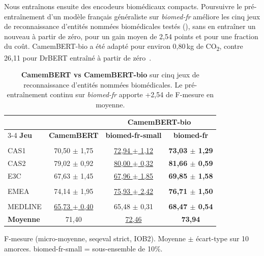 
\noindent Nous entraînons ensuite des encodeurs biomédicaux compacts. Poursuivre le
pré-entraînement d'un modèle français généraliste sur \emph{biomed-fr} améliore les
cinq jeux de reconnaissance d'entités nommées biomédicales testés
(), sans en entraîner un nouveau à partir de zéro, pour un gain
moyen de 2,54 points et pour une fraction du coût. CamemBERT-bio a été adapté pour
environ 0,80\,kg de CO\textsubscript{2}, contre 26,11 pour DrBERT entraîné à partir de
zéro~\citep{labrak2023drbert,touchent2023camembertbio}.

\begin{table}[ht]
\centering
\small
\setlength{\tabcolsep}{5pt}
\begin{threeparttable}[b]
\begin{tabular}{l c c c}
\toprule
& & \multicolumn{2}{c}{\textbf{CamemBERT-bio}} \\
\cmidrule(lr){3-4}
\textbf{Jeu} & \textbf{CamemBERT} & \textbf{biomed-fr-small} & \textbf{biomed-fr} \\
\midrule
\rowcolor{ThesisTableSep}
\multicolumn{4}{c}{\rule{0pt}{10pt}\textbf{Clinique}} \\[1pt]
CAS1 & 70,50 $\pm$ 1,75 & \underline{72,94 $\pm$ 1,12} & \textbf{73,03 $\pm$ 1,29} \\
CAS2 & 79,02 $\pm$ 0,92 & \underline{80,00 $\pm$ 0,32} & \textbf{81,66 $\pm$ 0,59} \\
E3C  & 67,63 $\pm$ 1,45 & \underline{67,96 $\pm$ 1,85} & \textbf{69,85 $\pm$ 1,58} \\
\midrule
\rowcolor{ThesisTableSep}
\multicolumn{4}{c}{\rule{0pt}{10pt}\textbf{Notices}} \\[1pt]
EMEA & 74,14 $\pm$ 1,95 & \underline{75,93 $\pm$ 2,42} & \textbf{76,71 $\pm$ 1,50} \\
\midrule
\rowcolor{ThesisTableSep}
\multicolumn{4}{c}{\rule{0pt}{10pt}\textbf{Scientifique}} \\[1pt]
MEDLINE & \underline{65,73 $\pm$ 0,40} & 65,48 $\pm$ 0,31 & \textbf{68,47 $\pm$ 0,54} \\
\midrule
\textbf{Moyenne} & 71,40 & \underline{72,46} & \textbf{73,94} \\
\bottomrule
\end{tabular}
\begin{tablenotes}
  \small
  \item F-mesure (micro-moyenne, seqeval strict, IOB2). Moyenne $\pm$ écart-type sur 10 amorces. biomed-fr-small = sous-ensemble de 10\%.
\end{tablenotes}
\end{threeparttable}
\caption{\textbf{CamemBERT vs CamemBERT-bio} sur cinq jeux de reconnaissance d'entités nommées biomédicales. Le pré-entraînement continu sur \textit{biomed-fr} apporte +2,54 de F-mesure en moyenne.}
\label{tab:bioVSbase}
\end{table}


